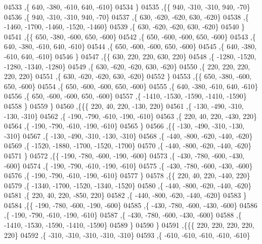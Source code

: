 \begin{DoxyCode}
04533     ,\{   640,  -380,  -610,   640,  -610\}
04534     \}
04535    ,\{\{   940,  -310,  -310,   940,   -70\}
04536     ,\{   940,  -310,  -310,   940,   -70\}
04537     ,\{   630,  -620,  -620,   630,  -620\}
04538     ,\{ -1460, -1700, -1460, -1520, -1460\}
04539     ,\{   630,  -620,  -620,   630,  -620\}
04540     \}
04541    ,\{\{   650,  -380,  -600,   650,  -600\}
04542     ,\{   650,  -600,  -600,   650,  -600\}
04543     ,\{   640,  -380,  -610,   640,  -610\}
04544     ,\{   650,  -600,  -600,   650,  -600\}
04545     ,\{   640,  -380,  -610,   640,  -610\}
04546     \}
04547    ,\{\{   630,   220,   220,   630,   220\}
04548     ,\{ -1280, -1520, -1280, -1340, -1280\}
04549     ,\{   630,  -620,  -620,   630,  -620\}
04550     ,\{   220,   220,   220,   220,   220\}
04551     ,\{   630,  -620,  -620,   630,  -620\}
04552     \}
04553    ,\{\{   650,  -380,  -600,   650,  -600\}
04554     ,\{   650,  -600,  -600,   650,  -600\}
04555     ,\{   640,  -380,  -610,   640,  -610\}
04556     ,\{   650,  -600,  -600,   650,  -600\}
04557     ,\{ -1410, -1530, -1590, -1410, -1590\}
04558     \}
04559    \}
04560   ,\{\{\{   220,    40,   220,  -130,   220\}
04561     ,\{  -130,  -490,  -310,  -130,  -310\}
04562     ,\{  -190,  -790,  -610,  -190,  -610\}
04563     ,\{   220,    40,   220,  -430,   220\}
04564     ,\{  -190,  -790,  -610,  -190,  -610\}
04565     \}
04566    ,\{\{  -130,  -490,  -310,  -130,  -310\}
04567     ,\{  -130,  -490,  -310,  -130,  -310\}
04568     ,\{  -440,  -800,  -620,  -440,  -620\}
04569     ,\{ -1520, -1880, -1700, -1520, -1700\}
04570     ,\{  -440,  -800,  -620,  -440,  -620\}
04571     \}
04572    ,\{\{  -190,  -780,  -600,  -190,  -600\}
04573     ,\{  -430,  -780,  -600,  -430,  -600\}
04574     ,\{  -190,  -790,  -610,  -190,  -610\}
04575     ,\{  -430,  -780,  -600,  -430,  -600\}
04576     ,\{  -190,  -790,  -610,  -190,  -610\}
04577     \}
04578    ,\{\{   220,    40,   220,  -440,   220\}
04579     ,\{ -1340, -1700, -1520, -1340, -1520\}
04580     ,\{  -440,  -800,  -620,  -440,  -620\}
04581     ,\{   220,    40,   220,  -850,   220\}
04582     ,\{  -440,  -800,  -620,  -440,  -620\}
04583     \}
04584    ,\{\{  -190,  -780,  -600,  -190,  -600\}
04585     ,\{  -430,  -780,  -600,  -430,  -600\}
04586     ,\{  -190,  -790,  -610,  -190,  -610\}
04587     ,\{  -430,  -780,  -600,  -430,  -600\}
04588     ,\{ -1410, -1530, -1590, -1410, -1590\}
04589     \}
04590    \}
04591   ,\{\{\{   220,   220,   220,   220,   220\}
04592     ,\{  -310,  -310,  -310,  -310,  -310\}
04593     ,\{  -610,  -610,  -610,  -610,  -610\}

\end{DoxyCode}
